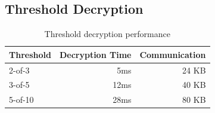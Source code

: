 \subsection{Threshold Decryption}

\begin{table}[h]
\centering
\begin{tabular}{@{}lrr@{}}
\toprule
\textbf{Threshold} & \textbf{Decryption Time} & \textbf{Communication} \\
\midrule
2-of-3 & 5ms & 24 KB \\
3-of-5 & 12ms & 40 KB \\
5-of-10 & 28ms & 80 KB \\
\bottomrule
\end{tabular}
\caption{Threshold decryption performance}
\label{tab:threshold-perf}
\end{table}

